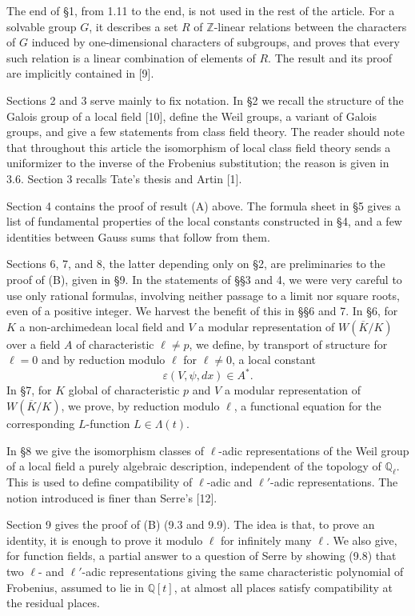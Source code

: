\documentclass[10pt]{article}
\newcommand{\Q}{\mathbb Q}
\newcommand{\Z}{\mathbb Z}
\begin{document}
The end of §1, from 1.11 to the end, is not used in the rest of the article. For a solvable group \(G\), it describes a set \(R\) of \(\Z\)-linear relations between the characters of \(G\) induced by one-dimensional characters of subgroups, and proves that every such relation is a linear combination of elements of \(R\). The result and its proof are implicitly contained in [9].

Sections 2 and 3 serve mainly to fix notation. In §2 we recall the structure of the Galois group of a local field [10], define the Weil groups, a variant of Galois groups, and give a few statements from class field theory. The reader should note that throughout this article the isomorphism of local class field theory sends a uniformizer to the inverse of the Frobenius substitution; the reason is given in 3.6. Section 3 recalls Tate's thesis and Artin [1].

Section 4 contains the proof of result (A) above. The formula sheet in §5 gives a list of fundamental properties of the local constants constructed in §4, and a few identities between Gauss sums that follow from them.

Sections 6, 7, and 8, the latter depending only on §2, are preliminaries to the proof of (B), given in §9. In the statements of §§3 and 4, we were very careful to use only rational formulas, involving neither passage to a limit nor square roots, even of a positive integer. We harvest the benefit of this in §§6 and 7. In §6, for \(K\) a non-archimedean local field and \(V\) a modular representation of \(W(\overline K/K)\) over a field \(A\) of characteristic \(\ell\ne p\), we define, by transport of structure for \(\ell=0\) and by reduction modulo \(\ell\) for \(\ell\ne0\), a local constant
\[
\varepsilon(V,\psi,dx)\in A^*.
\]
In §7, for \(K\) global of characteristic \(p\) and \(V\) a modular representation of \(W(\overline K/K)\), we prove, by reduction modulo \(\ell\), a functional equation for the corresponding \(L\)-function \(L\in\Lambda(t)\).

In §8 we give the isomorphism classes of \(\ell\)-adic representations of the Weil group of a local field a purely algebraic description, independent of the topology of \(\Q_\ell\). This is used to define compatibility of \(\ell\)-adic and \(\ell'\)-adic representations. The notion introduced is finer than Serre's [12].

Section 9 gives the proof of (B) (9.3 and 9.9). The idea is that, to prove an identity, it is enough to prove it modulo \(\ell\) for infinitely many \(\ell\). We also give, for function fields, a partial answer to a question of Serre by showing (9.8) that two \(\ell\)- and \(\ell'\)-adic representations giving the same characteristic polynomial of Frobenius, assumed to lie in \(\Q[t]\), at almost all places satisfy compatibility at the residual places.
\end{document}
